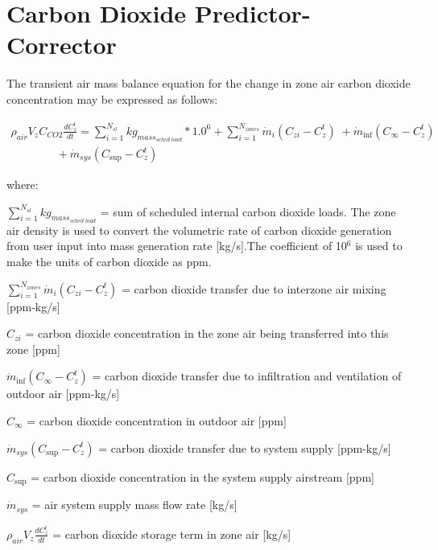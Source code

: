 \section{Carbon Dioxide Predictor-Corrector}\label{carbon-dioxide-predictor-corrector}

The transient air mass balance equation for the change in zone air carbon dioxide concentration may be expressed as follows:

\begin{equation}
\begin{array}{l}
{\rho_{air}}{V_z}{C_{CO2}}\frac{{dC_z^t}}{{dt}} = \sum\limits_{i = 1}^{{N_{sl}}} {k{g_{mas{s_{sched\;load}}}}*{{1.0}^6}}  + \sum\limits_{i = 1}^{{N_{zones}}} {{{\dot m}_i}} \left( {{C_{zi}} - C_z^t} \right)\; + {\dot m_{\inf }}\left( {{C_\infty } - C_z^t} \right) \\
\quad \quad \quad \quad + {\dot m_{sys}}\left( {{C_{\sup }} - C_z^t} \right)
\end{array}
\end{equation}

where:

\(\sum\limits_{i = 1}^{{N_{sl}}} {k{g_{mas{s_{sched\;load}}}}}\) = sum of scheduled internal carbon dioxide loads. The zone air density is used to convert the volumetric rate of carbon dioxide generation from user input into mass generation rate {[}kg/s{]}.The coefficient of 10\(^{6}\) is used to make the units of carbon dioxide as ppm.

\(\sum_{i = 1}^{N_{zones}} \dot m_i \left( C_{zi} - C_z^t \right)\) = carbon dioxide transfer due to interzone air mixing {[}ppm-kg/s{]}

\({C_{zi}}\) = carbon dioxide concentration in the zone air being transferred into this zone {[}ppm{]}

\({\dot m_{\inf }}\left( {{C_\infty } - C_z^t} \right)\) = carbon dioxide transfer due to infiltration and ventilation of outdoor air {[}ppm-kg/s{]}

\({C_\infty }\) = carbon dioxide concentration in outdoor air {[}ppm{]}

\({\dot m_{sys}}\left( {{C_{\sup }} - C_z^t} \right)\) = carbon dioxide transfer due to system supply {[}ppm-kg/s{]}

\({C_{\sup }}\) = carbon dioxide concentration in the system supply airstream {[}ppm{]}

\({\dot m_{sys}}\) = air system supply mass flow rate {[}kg/s{]}

\({\rho_{air}}{V_z}\frac{{dC_z^t}}{{dt}}\) = carbon dioxide storage term in zone air {[}kg/s{]}

